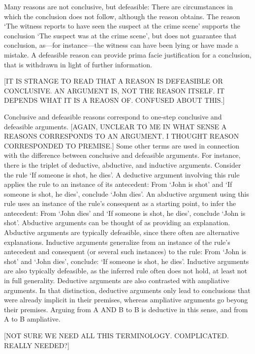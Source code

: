 \documentclass[10pt]{article}
\begin{document}
Many reasons are not conclusive, but defeasible: There are circumstances in which the conclusion does not follow, although the reason obtains. The reason `The witness reports to have seen the suspect at the crime scene' supports the conclusion `The suspect was at the crime scene', but does not guarantee that conclusion, as---for instance---the witness can have been lying or have made a mistake. A defeasible reason can provide prima facie justification for a conclusion, that is withdrawn in light of further information.

[IT IS STRANGE TO READ THAT A REASON IS DEFEASIBLE OR CONCLUSIVE. AN ARGUMENT IS, NOT THE REASON ITSELF. IT DEPENDS WHAT IT IS A REAOSN OF. CONFUSED ABOUT THIS.]

Conclusive and defeasible reasons correspond to one-step conclusive and defeasible arguments. [AGAIN, UNCLEAR TO ME IN WHAT SENSE A REASONS CORRESPONDS 
TO AN ARGUMENT. I THOUGHT REASON CORRESPONDED TO PREMISE.] Some other terms are used in connection with the difference between conclusive and defeasible arguments. For instance, there is the triplet of deductive, abductive, and inductive arguments. Consider the rule `If someone is shot, he dies'. A deductive argument involving this rule applies the rule to an instance of its antecedent: From `John is shot' and `If someone is shot, he dies', conclude `John dies'. An abductive argument using this rule uses an instance of the rule's consequent as a starting point, to infer the antecedent: From `John dies' and  `If someone is shot, he dies', conclude `John is shot'. Abductive arguments can be thought of as providing an explanation. Abductive arguments are typically defeasible, since there often are alternative explanations. Inductive arguments generalize from an instance of the rule's antecedent and consequent (or several such instances) to the rule: From `John is shot' and `John dies', conclude: `If someone is shot, he dies'. Inductive arguments are also typically defeasible, as the inferred rule often does not hold, at least not in full generality. Deductive arguments are also contrasted with ampliative arguments. In that distinction, deductive arguments only lead to conclusions that were already implicit in their premises, whereas ampliative arguments go beyong their premises. Arguing from A AND B to B is deductive in this sense, and from A to B ampliative.

[NOT SURE WE NEED ALL THIS TERMINOLOGY. COMPLICATED. REALLY NEEDED?]
\end{document}
